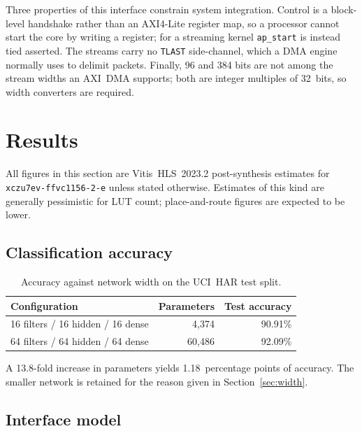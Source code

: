 \documentclass[11pt,a4paper]{article}
\begin{document}
Three properties of this interface constrain system integration. Control is a
block-level handshake rather than an AXI4-Lite register map, so a processor
cannot start the core by writing a register; for a streaming kernel
\texttt{ap\_start} is instead tied asserted. The streams carry no
\texttt{TLAST} side-channel, which a DMA engine normally uses to delimit
packets. Finally, 96 and 384 bits are not among the stream widths an AXI~DMA
supports; both are integer multiples of 32~bits, so width converters are
required.

\section{Results}
\label{sec:results}

All figures in this section are Vitis~HLS~2023.2 post-synthesis estimates for
\texttt{xczu7ev-ffvc1156-2-e} unless stated otherwise. Estimates of this kind
are generally pessimistic for LUT count; place-and-route figures are expected to
be lower.

\subsection{Classification accuracy}

\begin{table}[h]
\centering
\begin{tabular}{lrr}
\toprule
\textbf{Configuration} & \textbf{Parameters} & \textbf{Test accuracy} \\
\midrule
16 filters / 16 hidden / 16 dense & 4{,}374  & 90.91\% \\
64 filters / 64 hidden / 64 dense & 60{,}486 & 92.09\% \\
\bottomrule
\end{tabular}
\caption{Accuracy against network width on the UCI~HAR test split.}
\end{table}

A 13.8-fold increase in parameters yields 1.18~percentage points of accuracy.
The smaller network is retained for the reason given in
Section~\ref{sec:width}.

\subsection{Interface model}
\end{document}
